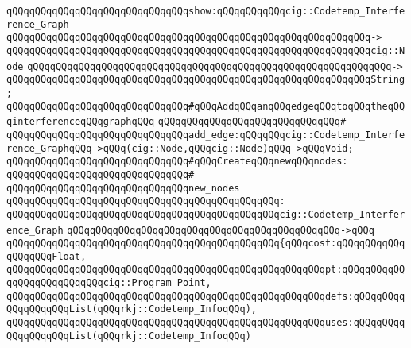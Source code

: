 \newline
\verb|qQQqqQQqqQQqqQQqqQQqqQQqqQQqqQQqshow:qQQqqQQqqQQqcig::Codetemp_Interference_Graph|\newline
\verb|qQQqqQQqqQQqqQQqqQQqqQQqqQQqqQQqqQQqqQQqqQQqqQQqqQQqqQQqqQQqqQQq->|\newline
\verb|qQQqqQQqqQQqqQQqqQQqqQQqqQQqqQQqqQQqqQQqqQQqqQQqqQQqqQQqqQQqqQQqcig::Node|\newline
\verb|qQQqqQQqqQQqqQQqqQQqqQQqqQQqqQQqqQQqqQQqqQQqqQQqqQQqqQQqqQQqqQQq->|\newline
\verb|qQQqqQQqqQQqqQQqqQQqqQQqqQQqqQQqqQQqqQQqqQQqqQQqqQQqqQQqqQQqqQQqString;|\newline
\newline
\newline
\verb|qQQqqQQqqQQqqQQqqQQqqQQqqQQqqQQq#qQQqAddqQQqanqQQqedgeqQQqtoqQQqtheqQQqinterferenceqQQqgraphqQQq|\newline
\verb|qQQqqQQqqQQqqQQqqQQqqQQqqQQqqQQq#|\newline
\verb|qQQqqQQqqQQqqQQqqQQqqQQqqQQqqQQqadd_edge:qQQqqQQqcig::Codetemp_Interference_GraphqQQq->qQQq(cig::Node,qQQqcig::Node)qQQq->qQQqVoid;|\newline
\newline
\newline
\verb|qQQqqQQqqQQqqQQqqQQqqQQqqQQqqQQq#qQQqCreateqQQqnewqQQqnodes:|\newline
\verb|qQQqqQQqqQQqqQQqqQQqqQQqqQQqqQQq#|\newline
\verb|qQQqqQQqqQQqqQQqqQQqqQQqqQQqqQQqnew_nodes|\newline
\verb|qQQqqQQqqQQqqQQqqQQqqQQqqQQqqQQqqQQqqQQqqQQqqQQq:|\newline
\verb|qQQqqQQqqQQqqQQqqQQqqQQqqQQqqQQqqQQqqQQqqQQqqQQqcig::Codetemp_Interference_Graph|\newline
\verb|qQQqqQQqqQQqqQQqqQQqqQQqqQQqqQQqqQQqqQQqqQQqqQQq->qQQq|\newline
\verb|qQQqqQQqqQQqqQQqqQQqqQQqqQQqqQQqqQQqqQQqqQQqqQQq{qQQqcost:qQQqqQQqqQQqqQQqqQQqFloat,|\newline
\verb|qQQqqQQqqQQqqQQqqQQqqQQqqQQqqQQqqQQqqQQqqQQqqQQqqQQqqQQqpt:qQQqqQQqqQQqqQQqqQQqqQQqqQQqcig::Program_Point,|\newline
\verb|qQQqqQQqqQQqqQQqqQQqqQQqqQQqqQQqqQQqqQQqqQQqqQQqqQQqqQQqdefs:qQQqqQQqqQQqqQQqqQQqList(qQQqrkj::Codetemp_InfoqQQq),|\newline
\verb|qQQqqQQqqQQqqQQqqQQqqQQqqQQqqQQqqQQqqQQqqQQqqQQqqQQqqQQquses:qQQqqQQqqQQqqQQqqQQqList(qQQqrkj::Codetemp_InfoqQQq)|\newline
